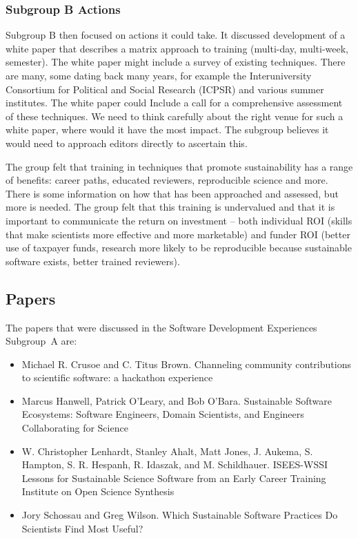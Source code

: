 \documentclass[11pt, oneside]{amsart}
\begin{document}
\subsubsection{Subgroup B Actions}

Subgroup B then focused on actions it could take. It discussed development of a
white paper that describes a matrix approach to training (multi-day, multi-week,
semester). The white paper might include a survey of existing techniques. There
are many, some dating back many years, for example the Interuniversity
Consortium for Political and Social Research (ICPSR) and various summer
institutes. The white paper could Include a call for a comprehensive assessment
of these techniques. We need to think carefully about the right venue for such a
white paper, where would it have the most impact. The subgroup believes it would
need to approach editors directly to ascertain this.

The group felt that training in techniques that promote sustainability has a
range of benefits: career paths, educated reviewers, reproducible science and
more. There is some information on how that has been approached and assessed,
but more is needed. The group felt that this training is undervalued and that it
is important to communicate the return on investment -- both individual ROI
(skills that make scientists more effective and more marketable) and funder ROI
(better use of taxpayer funds, research more likely to be reproducible because
sustainable software exists, better trained reviewers).



\subsection{Papers}
The papers that were discussed in the Software Development Experiences Subgroup~A are:

\begin{itemize}
\item Michael R. Crusoe and C. Titus Brown. Channeling community contributions to
scientific software: a hackathon experience~\cite{wssspe2_crusoe}

\item Marcus Hanwell, Patrick O'Leary, and Bob O'Bara. Sustainable Software
Ecosystems: Software Engineers, Domain Scientists, and Engineers Collaborating
for Science~\cite{wssspe2_hanwell}

\item W. Christopher Lenhardt, Stanley Ahalt, Matt Jones, J. Aukema, S. Hampton,
S. R. Hespanh, R. Idaszak, and M. Schildhauer. {ISEES-WSSI} Lessons for
Sustainable Science Software from an Early Career Training Institute on Open
Science Synthesis~\cite{wssspe2_lenhardt}

\item Jory Schossau and Greg Wilson. Which Sustainable Software Practices Do
Scientists Find Most Useful?~\cite{wssspe2_schossau}

\end{itemize}
\end{document}
